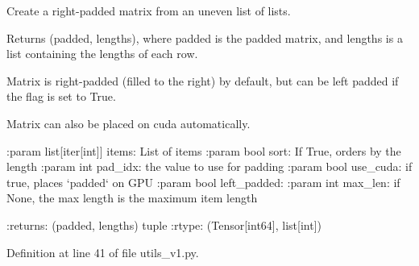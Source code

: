 \begin{DoxyVerb}Create a right-padded matrix from an uneven list of lists.

Returns (padded, lengths), where padded is the padded matrix, and lengths
is a list containing the lengths of each row.

Matrix is right-padded (filled to the right) by default, but can be
left padded if the flag is set to True.

Matrix can also be placed on cuda automatically.

:param list[iter[int]] items: List of items
:param bool sort: If True, orders by the length
:param int pad_idx: the value to use for padding
:param bool use_cuda: if true, places `padded` on GPU
:param bool left_padded:
:param int max_len: if None, the max length is the maximum item length

:returns: (padded, lengths) tuple
:rtype: (Tensor[int64], list[int])
\end{DoxyVerb}
 

Definition at line 41 of file utils\+\_\+v1.\+py.



